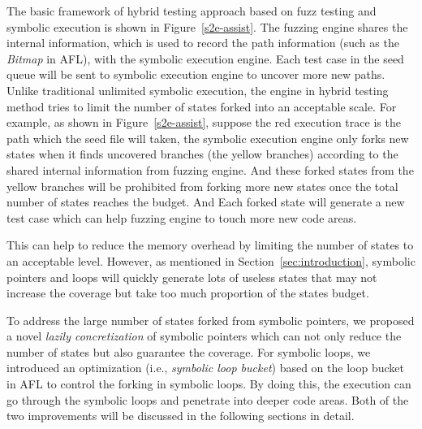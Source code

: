 The basic framework of hybrid testing approach based on fuzz testing and symbolic execution is shown in Figure~\ref{s2e-assist}. The fuzzing engine shares the internal information, which is used to record the path information (such as the \textit{Bitmap} in AFL), with the symbolic execution engine. 
Each test case in the seed queue will be sent to symbolic execution engine to uncover more new paths. 
Unlike traditional unlimited symbolic execution, the engine in hybrid testing method tries to limit the number of states forked into an acceptable scale. For example, as shown in Figure~\ref{s2e-assist}, suppose the red execution trace is the path which the seed file will taken, the symbolic execution engine only forks new states when it finds uncovered branches (the yellow branches) according to the shared internal information from fuzzing engine. And these forked states from the yellow branches will be prohibited from forking more new states once the total number of states reaches the budget. And Each forked state will generate a new test case which can help fuzzing engine to touch more new code areas. 

This can help to reduce the memory overhead by limiting the number of states to an acceptable level. However, as mentioned in Section~\ref{sec:introduction}, symbolic pointers and loops will quickly generate lots of useless states that may not increase the coverage but take too much proportion of the states budget.

To address the large number of states forked from symbolic pointers, we proposed a novel \textit{lazily concretization} of symbolic pointers which can not only reduce the number of states but also guarantee the coverage. 
For symbolic loops, we introduced an optimization (i.e., \textit{symbolic loop bucket}) based on the loop bucket in AFL to control the forking in symbolic loops. By doing this, the execution can go through the symbolic loops and penetrate into deeper code areas.
Both of the two improvements will be discussed in the following sections in detail.

